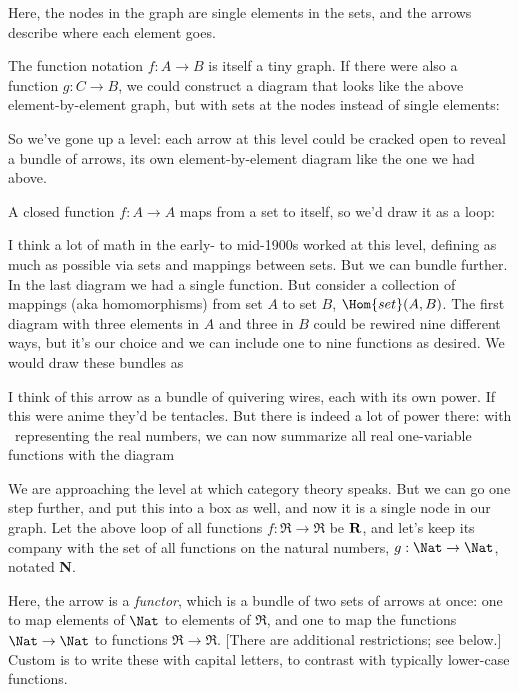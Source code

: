 \documentclass[11pt]{article}
\begin{document}
Here, the nodes in the graph are single elements in the sets, and the arrows describe
where each element goes.

The function notation $f:A\to B$ is itself a tiny graph. If there were also a function
$g:C\to B$, we could construct a diagram that looks like the above element-by-element graph, but with sets at the nodes instead of single elements:

So we've gone up a level: each arrow at this level could be cracked open to reveal
a bundle of arrows, its own element-by-element diagram like the one we had above.

A closed function $f:A\to A$ maps from a set to itself, so we'd draw it as a loop:


I think a lot of math in the early- to mid-1900s worked at this level, defining as much as
possible via sets and mappings between sets. But we can bundle further. In the last
diagram we had a single function. But consider a collection of mappings (aka homomorphisms)
from set $A$ to set $B$, $\Hom{set}(A, B)$.
The first diagram with three elements in $A$ and
three in $B$ could be rewired nine different ways, but it's our choice and we can include
one to nine functions as desired.  We would draw these
bundles as

I think of this arrow as a bundle of quivering wires, each with its own power. If this were anime
they'd be tentacles. But there is indeed a lot of power there: with \Re\ representing the
real numbers, we can now summarize all real one-variable functions with the diagram 

We are approaching the level at which category theory speaks. But we can go one step further, and put
this into a box as well, and now it is a single node in our graph. Let the above loop of
all functions $f:\Re\to\Re$ be $\bf R$, and let's keep its company with
the set of all functions on the natural numbers, $g:\Nat\to\Nat$, notated {\bf N}.


Here, the arrow is a {\em functor}, which is a bundle of two sets of arrows at once:
one to map elements of $\Nat$ to elements of $\Re$, and one to map the functions
$\Nat\to \Nat$ to functions $\Re\to \Re$. [There are additional restrictions; see
below.] Custom is to write these with capital letters, to contrast with typically
lower-case functions.
\end{document}
